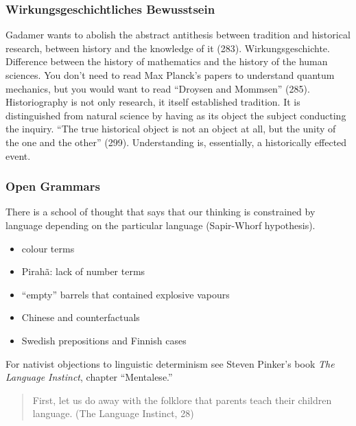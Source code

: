\documentclass[xcolor=dvipsnames]{beamer}
\begin{document}
\begin{frame}
  \frametitle{Wirkungsgeschichtliches Bewusstsein}
  Gadamer wants to abolish the abstract antithesis between tradition
  and historical research, between history and the knowledge of it
  (283). Wirkungsgeschichte. Difference between the history of
  mathematics and the history of the human sciences. You don't need to
  read Max Planck's papers to understand quantum mechanics, but you
  would want to read ``Droysen and Mommsen'' (285). Historiography is
  not only research, it itself established tradition. It is
  distinguished from natural science by having as its object the
  subject conducting the inquiry. ``The true historical object is not
  an object at all, but the unity of the one and the other'' (299).
  Understanding is, essentially, a historically effected event.
\end{frame}

\begin{frame}
  \frametitle{Open Grammars}
  There is a school of thought that says that our thinking is
  constrained by language depending on the particular language
  (Sapir-Whorf hypothesis).
  \begin{itemize}
  \item colour terms
  \item Pirah{\~a}: lack of number terms
  \item ``empty'' barrels that contained explosive vapours
  \item Chinese and counterfactuals
  \item Swedish prepositions and Finnish cases
  \end{itemize}
  For nativist objections to linguistic determinism see Steven
  Pinker's book \emph{The Language Instinct}, chapter ``Mentalese.''
  \begin{quote}
    First, let us do away with the folklore that parents teach their
    children language. (The Language Instinct, 28)
  \end{quote}
\end{frame}
\end{document}
